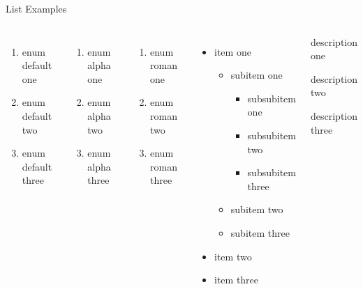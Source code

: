 \documentclass[10pt, xcolor={table}]{beamer}
\begin{document}
\begin{frame}{List Examples}
    \begin{columns}[]
    \column{5cm}  %
        \begin{enumerate}
        \item enum default one
        \item enum default two
        \item enum default three
        \end{enumerate}
        \bigskip\bigskip
        
        \begin{enumerate}[a]
        \item enum alpha one
        \item enum alpha two
        \item enum alpha three
        \end{enumerate}
        \bigskip\bigskip
        
        \begin{enumerate}[I]
        \item enum roman one
        \item enum roman two
        \item enum roman three
        \end{enumerate}
    
     \column{5cm}   %
        \begin{itemize}
        \item item one
        \begin{itemize}
        \item subitem one
        \begin{itemize}
        \item subsubitem one
        \item subsubitem two
        \item subsubitem three
        \end{itemize}
        \item subitem two
        \item subitem three
        \end{itemize}
        \item item two
        \item item three
        \end{itemize}
        \bigskip\bigskip
    
        \begin{description}[align=left]
        \item[label1] description one
        \item[label2] description two
        \item[label3] description three
        \end{description}
    \end{columns}
\end{frame}
\end{document}
